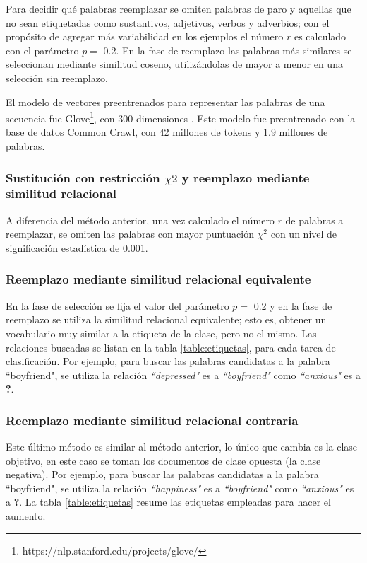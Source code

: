 Para decidir qué palabras reemplazar se omiten palabras de paro y aquellas que no sean etiquetadas como sustantivos, adjetivos, verbos y adverbios; con el propósito de agregar más variabilidad en los ejemplos el número $r$ es calculado con el parámetro $p=$ 0.2. En la fase de reemplazo las palabras más similares se seleccionan mediante similitud coseno, utilizándolas de mayor a menor en una selección sin reemplazo.

El modelo de vectores preentrenados para representar las palabras de una secuencia fue Glove\footnote{https://nlp.stanford.edu/projects/glove/}, con 300 dimensiones \citep{pennington2014glove}. Este modelo fue preentrenado con la base de datos Common Crawl, con 42 millones de tokens y 1.9 millones de palabras. 


\subsubsection{Sustitución con restricción $\chi2$  y reemplazo mediante similitud relacional}
A diferencia del método anterior, una vez calculado el número $r$ de palabras a reemplazar, se omiten las palabras con mayor puntuación $\chi^2$ con un nivel de significación estadística de 0.001. 


\subsubsection{Reemplazo mediante similitud relacional equivalente}
En la fase de selección se fija el valor del parámetro $p=$ 0.2 y en la fase de reemplazo se utiliza la similitud relacional equivalente; esto es, obtener un vocabulario muy similar a la etiqueta de la clase, pero no el mismo. Las relaciones buscadas se listan en la tabla \ref{table:etiquetas}, para cada tarea de clasificación. Por ejemplo, para buscar las palabras candidatas a la palabra ``boyfriend", se utiliza la relación \textit{``depressed"} es a \textit{``boyfriend"} como \textit{``anxious"} es a \textbf{?}. 

\subsubsection{Reemplazo mediante similitud relacional contraria}
Este último método es similar al método anterior, lo único que cambia es la clase objetivo, en este caso se toman los documentos de clase opuesta (la clase negativa). Por ejemplo, para buscar las palabras candidatas a la palabra ``boyfriend", se utiliza la relación \textit{``happiness"} es a \textit{``boyfriend"} como \textit{``anxious"} es a \textbf{?}. La tabla \ref{table:etiquetas} resume las etiquetas empleadas para hacer el aumento.

